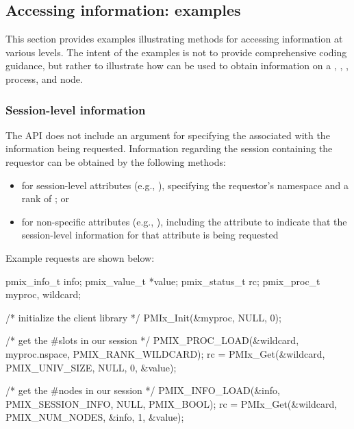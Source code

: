 \subsection{Accessing information: examples}
\label{chap:api_kv:getex}

This section provides examples illustrating methods for accessing information at various levels. The intent of the examples is not to provide comprehensive coding guidance, but rather to illustrate how  can be used to obtain information on a , , , process, and node.

\subsubsection{Session-level information}

The  \ac{API} does not include an argument for specifying the  associated with the information being requested. Information regarding the session containing the requestor can be obtained by the following methods:

\begin{itemize}
\item for session-level attributes (e.g., ), specifying the requestor's namespace and a rank of ; or
\item for non-specific attributes (e.g., ), including the  attribute to indicate that the session-level information for that attribute is being requested
\end{itemize}

Example requests are shown below:

\cspecificstart
\begin{codepar}
pmix_info_t info;
pmix_value_t *value;
pmix_status_t rc;
pmix_proc_t myproc, wildcard;

/* initialize the client library */
PMIx_Init(&myproc, NULL, 0);

/* get the #slots in our session */
PMIX_PROC_LOAD(&wildcard, myproc.nspace, PMIX_RANK_WILDCARD);
rc = PMIx_Get(&wildcard, PMIX_UNIV_SIZE, NULL, 0, &value);

/* get the #nodes in our session */
PMIX_INFO_LOAD(&info, PMIX_SESSION_INFO, NULL, PMIX_BOOL);
rc = PMIx_Get(&wildcard, PMIX_NUM_NODES, &info, 1, &value);
\end{codepar}
\cspecificend

